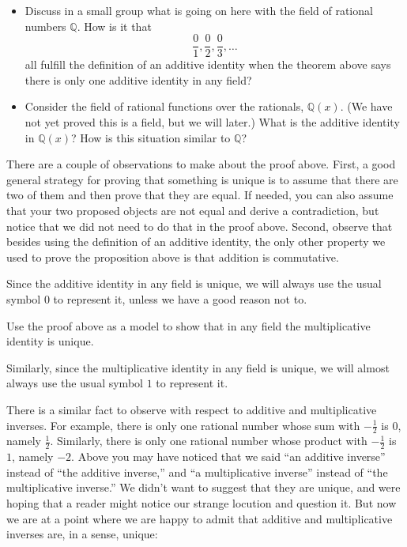 \documentclass[11pt]{article}
\newenvironment{task}
	{\begin{mdframed}[linecolor=lightgray, linewidth=3pt]\raggedright}
	{\end{mdframed}}
\theoremstyle{definition}
\begin{document}
\begin{task}
  \begin{itemize}
    \item Discuss in a small group what is going on here with the field of rational numbers $\mathbb{Q}$. How is it that 
      \[ \frac{0}{1}, \frac{0}{2}, \frac{0}{3}, \dots \]
      all fulfill the definition of an additive identity when the theorem above says there is only one additive identity in any field?
    \item Consider the field of rational functions over the rationals, $\mathbb{Q}(x)$. (We have not yet proved this is a field, but
      we will later.) What is the additive identity in $\mathbb{Q}(x)$? How is this situation similar to $\mathbb{Q}$?
  \end{itemize}
\end{task}

There are a couple of observations to make about the proof above. First, a good general strategy for proving that something is unique is to assume that there are
two of them and then prove that they are equal.  If needed, you can also assume that your two proposed objects are not equal and derive a contradiction, but
notice that we did not need to do that in the proof above. Second, observe that besides using the definition of an additive identity, the only other property we
used to prove the proposition above is that addition is commutative.

Since the additive identity in any field is unique, we will always use the usual symbol $0$ to represent it, unless we have a good reason not to. 

\begin{task}
  Use the proof above as a model to show that in any field the multiplicative identity is unique.
\end{task}

Similarly, since the multiplicative identity in any field is unique, we will almost always use the usual symbol $1$ to represent it. 

There is a similar fact to observe with respect to additive and multiplicative inverses. For example, there is only one rational number whose sum with
$-\frac{1}{2}$ is 0, namely $\frac{1}{2}$. Similarly, there is only one rational number whose product with $-\frac{1}{2}$ is $1$, namely $-2$. 
Above you may have noticed that we said ``an additive inverse'' instead of ``the additive inverse,'' and
``a multiplicative inverse'' instead of ``the multiplicative inverse.'' We didn't want to suggest that they are unique, and were hoping that a reader might notice
our strange locution and question it. But now we are at a point where we are happy to admit that additive and multiplicative inverses are, in a sense, unique:
\end{document}
